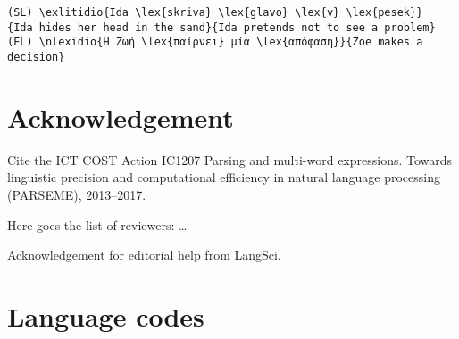 \documentclass[output=paper,
modfonts,
]{langscibook}
\begin{document}
\begin{small}
\begin{verbatim}
(SL) \exlitidio{Ida \lex{skriva} \lex{glavo} \lex{v} \lex{pesek}}
{Ida hides her head in the sand}{Ida pretends not to see a problem} 
(EL) \nlexidio{Η Ζωή \lex{παίρνει} μία \lex{απόφαση}}{Zoe makes a decision}
\end{verbatim}
\end{small}





\section{Acknowledgement}
Cite the ICT COST Action
IC1207 Parsing and multi-word expressions. Towards linguistic precision and computational efficiency in natural language processing (PARSEME), 2013–2017. 

Here goes the list of reviewers: \ldots

Acknowledgement for editorial help from LangSci.

\section{Language codes}
\label{sec:lang-codes}
\end{document}

